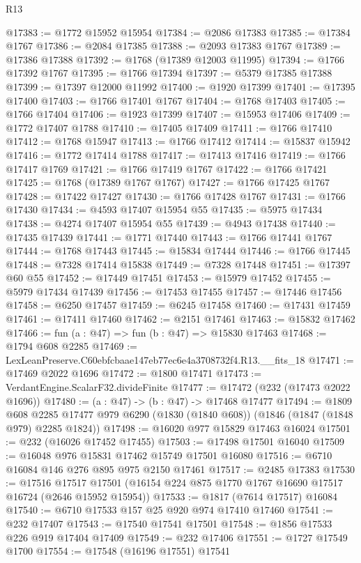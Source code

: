\begin{lexlean}{R13}
\begin{coremodule}
@17383 := @1772 @15952 @15954
@17384 := @2086 @17383
@17385 := @17384 @1767
@17386 := @2084 @17385
@17388 := @2093 @17383 @1767
@17389 := @17386 @17388
@17392 := @1768 (@17389 @12003 @11995)
@17394 := @1766 @17392 @1767
@17395 := @1766 @17394
@17397 := @5379 @17385 @17388
@17399 := @17397 @12000 @11992
@17400 := @1920 @17399
@17401 := @17395 @17400
@17403 := @1766 @17401 @1767
@17404 := @1768 @17403
@17405 := @1766 @17404
@17406 := @1923 @17399
@17407 := @15953 @17406
@17409 := @1772 @17407 @1788
@17410 := @17405 @17409
@17411 := @1766 @17410
@17412 := @1768 @15947
@17413 := @1766 @17412
@17414 := @15837 @15942
@17416 := @1772 @17414 @1788
@17417 := @17413 @17416
@17419 := @1766 @17417 @1769
@17421 := @1766 @17419 @1767
@17422 := @1766 @17421
@17425 := @1768 (@17389 @1767 @1767)
@17427 := @1766 @17425 @1767
@17428 := @17422 @17427
@17430 := @1766 @17428 @1767
@17431 := @1766 @17430
@17434 := @4593 @17407 @15954 @55
@17435 := @5975 @17434
@17438 := @4274 @17407 @15954 @55
@17439 := @4943 @17438
@17440 := @17435 @17439
@17441 := @1771 @17440
@17443 := @1766 @17441 @1767
@17444 := @1768 @17443
@17445 := @15834 @17444
@17446 := @1766 @17445
@17448 := @7328 @17414 @15838
@17449 := @7328 @17448
@17451 := @17397 @60 @55
@17452 := @17449 @17451
@17453 := @15979 @17452
@17455 := @5979 @17434 @17439
@17456 := @17453 @17455
@17457 := @17446 @17456
@17458 := @6250 @17457
@17459 := @6245 @17458
@17460 := @17431 @17459
@17461 := @17411 @17460
@17462 := @2151 @17461
@17463 := @15832 @17462
@17466 := fun (a : @47) => fun (b : @47) => @15830 @17463
@17468 := @1794 @608 @2285
@17469 := LexLeanPreserve.C60ebfcbaae147eb77ec6e4a3708732f4.R13.__fits_18
@17471 := @17469 @2022 @1696
@17472 := @1800 @17471
@17473 := VerdantEngine.ScalarF32.divideFinite
@17477 := @17472 (@232 (@17473 @2022 @1696))
@17480 := (a : @47) -> (b : @47) -> @17468 @17477
@17494 := @1809
    @608
    @2285
    @17477
    @979
    @6290
    (@1830 (@1840 @608))
    (@1846 (@1847 (@1848 @979) @2285 @1824))
@17498 := @16020 @977 @15829 @17463 @16024
@17501 := @232 (@16026 @17452 @17455)
@17503 := @17498 @17501 @16040
@17509 := @16048 @976 @15831 @17462 @15749 @17501 @16080
@17516 := @6710 @16084 @146 @276 @895 @975 @2150 @17461
@17517 := @2485 @17383
@17530 := @17516
    @17517
    @17501
    (@16154 @224 @875 @1770 @1767 @16690 @17517 @16724 (@2646 @15952 @15954))
@17533 := @1817 (@7614 @17517) @16084
@17540 := @6710 @17533 @157 @25 @920 @974 @17410 @17460
@17541 := @232 @17407
@17543 := @17540 @17541 @17501
@17548 := @1856 @17533 @226 @919 @17404 @17409
@17549 := @232 @17406
@17551 := @1727 @17549 @1700
@17554 := @17548 (@16196 @17551) @17541

\end{coremodule}
\end{lexlean}
